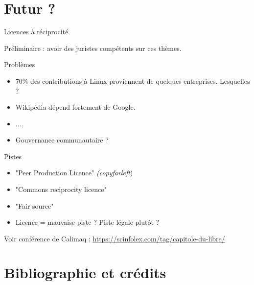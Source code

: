 \documentclass{beamer}
\begin{document}

\section{Futur ?}

\begin{frame}{Licences à réciprocité}

Préliminaire : avoir des juristes compétents sur ces thèmes.

  \begin{block}{Problèmes}
    \begin{itemize}
    \item 70\% des contributions à Linux proviennent de quelques entreprises. Lesquelles ?
    \item Wikipédia dépend fortement de Google.
    \item ....
    \item Gouvernance communautaire ? 
    \end{itemize}
  \end{block}

  \begin{block}{Pistes}
    \begin{itemize}
    \item "Peer Production Licence" \textit{(copyfarleft})
    \item "Commons reciprocity licence"
    \item "Fair source"
    \item Licence = mauvaise piste ? Piste légale plutôt ?
    \end{itemize}
  
  \end{block}
  
Voir conférence de Calimaq : \url{https://scinfolex.com/tag/capitole-du-libre/}
  
\end{frame}

\section{Bibliographie et crédits}
\end{document}
